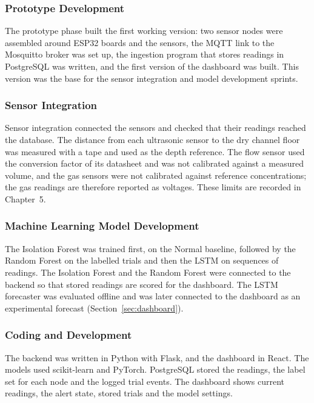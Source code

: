 \documentclass[12pt, a4paper]{article}
\begin{document}
\subsubsection{Prototype Development}

The prototype phase built the first working version: two sensor nodes were assembled around ESP32 boards and the sensors, the MQTT link to the Mosquitto broker was set up, the ingestion program that stores readings in PostgreSQL was written, and the first version of the dashboard was built. This version was the base for the sensor integration and model development sprints.

\subsubsection{Sensor Integration}

Sensor integration connected the sensors and checked that their readings reached the database. The distance from each ultrasonic sensor to the dry channel floor was measured with a tape and used as the depth reference. The flow sensor used the conversion factor of its datasheet and was not calibrated against a measured volume, and the gas sensors were not calibrated against reference concentrations; the gas readings are therefore reported as voltages. These limits are recorded in Chapter~5.

\subsubsection{Machine Learning Model Development}

The Isolation Forest was trained first, on the Normal baseline, followed by the Random Forest on the labelled trials and then the LSTM on sequences of readings. The Isolation Forest and the Random Forest were connected to the backend so that stored readings are scored for the dashboard. The LSTM forecaster was evaluated offline and was later connected to the dashboard as an experimental forecast (Section~\ref{sec:dashboard}).

\subsubsection{Coding and Development}

The backend was written in Python with Flask, and the dashboard in React. The models used scikit-learn and PyTorch. PostgreSQL stored the readings, the label set for each node and the logged trial events. The dashboard shows current readings, the alert state, stored trials and the model settings.
\end{document}
